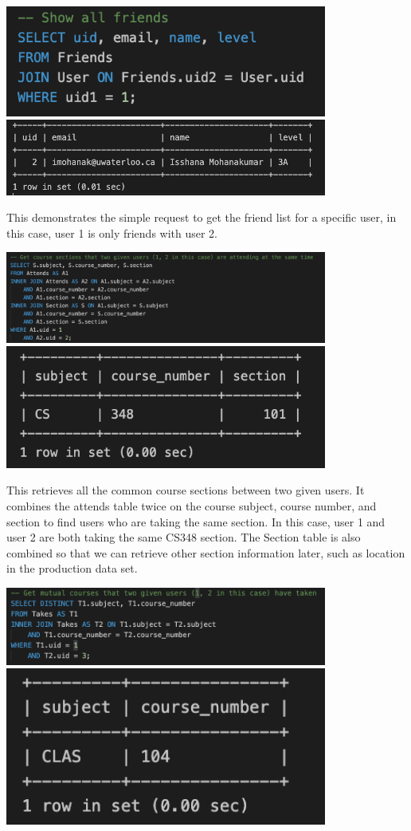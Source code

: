 \documentclass[12pt, a4paper]{article}
\begin{document}
\begin{center}
    \includegraphics[width=400px]{R9/q1}
    \includegraphics[width=400px]{R9/q1out}
\end{center}
This demonstrates the simple request to get the friend list for a specific user, in this case, user 1 is only friends with user 2.
\begin{center}
    \includegraphics[width=400px]{R9/q2}
    \includegraphics[width=400px]{R9/q2out}
\end{center}
This retrieves all the common course sections between two given users. It combines the attends table twice on the course subject, course number, and section to find users who are taking the same section. In this case, user 1 and user 2 are both taking the same CS348 section. The Section table is also combined so that we can retrieve other section information later, such as location in the production data set.
\begin{center}
    \includegraphics[width=400px]{R9/q3}
    \includegraphics[width=400px]{R9/q3out}
\end{center}
\end{document}
